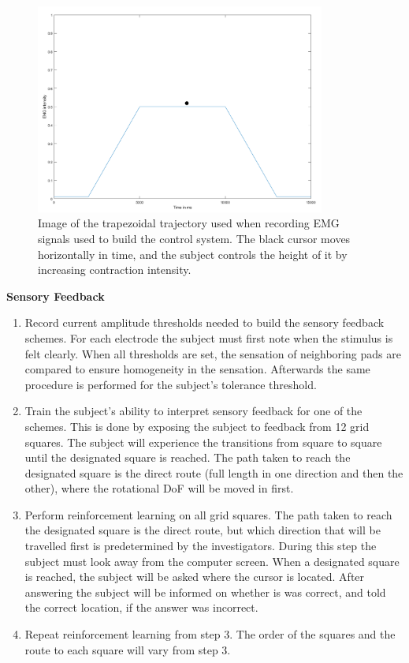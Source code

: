 \begin{figure}[H]                 
	\includegraphics[width=0.85\textwidth]{figures/trapezoid2}  
	\caption{Image of the trapezoidal trajectory used when recording EMG signals used to build the control system. The black cursor moves horizontally in time, and the subject controls the height of it by increasing contraction intensity.}
	\label{fig:trapezoid} 
\end{figure}

\noindent\textbf{Sensory Feedback} \\
\vspace{-5pt}
\begin{enumerate}
	\item Record current amplitude thresholds needed to build the sensory feedback schemes. For each electrode the subject must first note when the stimulus is felt clearly. When all thresholds are set, the sensation of neighboring pads are compared to ensure homogeneity in the sensation. Afterwards the same procedure is performed for the subject's tolerance threshold. 
	\item Train the subject's ability to interpret sensory feedback for one of the schemes. This is done by exposing the subject to feedback from 12 grid squares. The subject will experience the transitions from square to square until the designated square is reached. The path taken to reach the designated square is the direct route (full length in one direction and then the other), where the rotational DoF will be moved in first. 
	\item Perform reinforcement learning on all grid squares. The path taken to reach the designated square is the direct route, but which direction that will be travelled first is predetermined by the investigators. During this step the subject must look away from the computer screen. When a designated square is reached, the subject will be asked where the cursor is located. After answering the subject will be informed on whether is was correct, and told the correct location, if the answer was incorrect. 
	\item Repeat reinforcement learning from step 3. The order of the squares and the route to each square will vary from step 3.
\end{enumerate}

